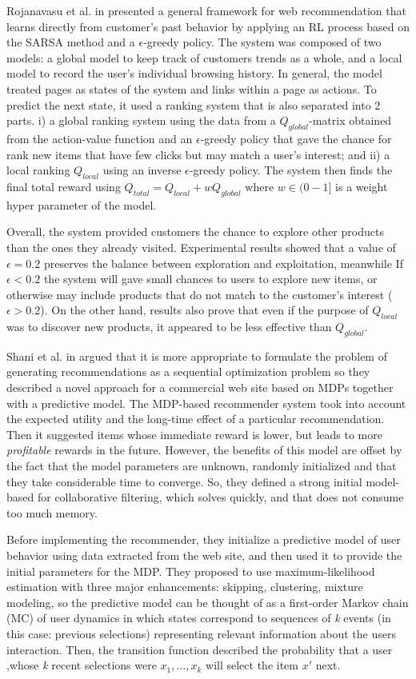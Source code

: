Rojanavasu et al. in \cite{rojanavasu2005new} presented a general framework for web recommendation that learns directly from customer's past behavior by applying an RL process based on the SARSA method and a $\epsilon$-greedy policy. The system was composed of two models: a global model to keep track of customers trends as a whole, and a local model to record the user's individual browsing history. In general, the model treated pages as states of the system and links within a page as actions. To predict the next state, it used a ranking system that is also separated into 2 parts. i) a global ranking system using the data from a $Q_{global}$-matrix obtained from the action-value function and an $\epsilon$-greedy policy that gave the chance for rank new items that have few clicks but may match a user's interest; and ii) a local ranking $Q_{local}$ using an inverse $\epsilon$-greedy policy. The system then finds the final total reward using $Q_{total}=Q_{local} + wQ_{global}$ where $w \in (0-1]$ is a weight hyper parameter of the model. 

Overall, the system provided customers the chance to explore other products than the ones they already visited. Experimental results showed that a value of $\epsilon=0.2$ preserves the balance between exploration and exploitation, meanwhile If $\epsilon < 0.2$ the system will gave small chances to users to explore new items, or otherwise may include products that do not match to the customer's interest ($\epsilon > 0.2$). On the other hand, results also prove that even if the purpose of $Q_{local}$ was to discover new products, it appeared to be less effective than $Q_{global}$.

Shani et al. in \cite{shani2005mdp} argued that it is more appropriate to formulate the problem of generating recommendations as a sequential optimization problem so they described a novel approach for a commercial web site based on MDPs together with a predictive model. The MDP-based recommender system took into account the expected utility and the long-time effect of a particular recommendation. Then it suggested items whose immediate reward is lower, but leads to more \textit{profitable} rewards in the future. However, the benefits of this model are offset by the fact that the model parameters are unknown, randomly initialized and that they take considerable time to converge. So, they defined a strong initial model-based for collaborative filtering, which solves quickly, and that does not consume too much memory.

Before implementing the recommender, they initialize a predictive model of user behavior using data extracted from the web site, and then used it to provide the initial parameters for the MDP. They proposed to use maximum-likelihood estimation with three major enhancements: skipping, clustering, mixture modeling, so the predictive model can be thought of as a first-order Markov chain (MC) of user dynamics in which states correspond to sequences of \textit{k} events (in this case: previous selections) representing relevant information about the users interaction. Then, the transition function described the probability that a user ,whose \textit{k} recent selections were $x_1, . . . ,x_k$ will select the item $x'$ next.

